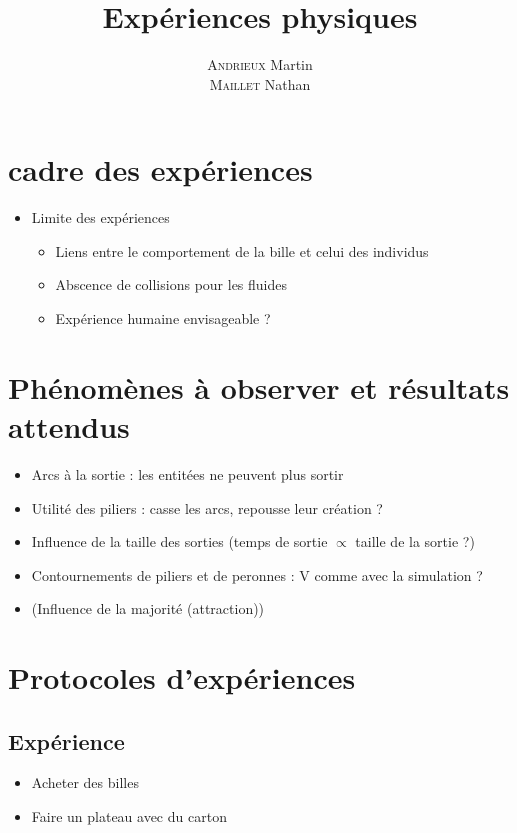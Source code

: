\documentclass[12pt, a4paper, french]{article}
\title{Expériences physiques}
\author{\textsc{Andrieux} Martin\\
	\textsc{Maillet} Nathan}
\begin{document}
	\maketitle
	\section{cadre des expériences}
	\begin{itemize}[label =$\bullet$]
		\item Limite des expériences
		\begin{itemize}[label =$\circ$]
			\item Liens entre le comportement de la bille et celui des individus
			\item Abscence de collisions pour les fluides
			\item Expérience humaine envisageable ?
		\end{itemize}
	\end{itemize}
	
	
	\section{Phénomènes à observer et résultats attendus}
	\begin{itemize}[label =$\bullet$]
		\item Arcs à la sortie : les entitées ne peuvent plus sortir
		\item Utilité des piliers : casse les arcs, repousse leur création ?
		\item Influence de la taille des sorties (temps de sortie $\propto$ taille de la sortie ?) 
		\item Contournements de piliers et de peronnes : V comme avec la simulation ?
		\item (Influence de la majorité (attraction))
	\end{itemize}
	
	
	
	\section{Protocoles d'expériences}
	\subsection{Expérience}
	\begin{itemize}[label =$\bullet$]
		\item Acheter des billes
		\item Faire un plateau avec du carton
	\end{itemize}
\end{document}

